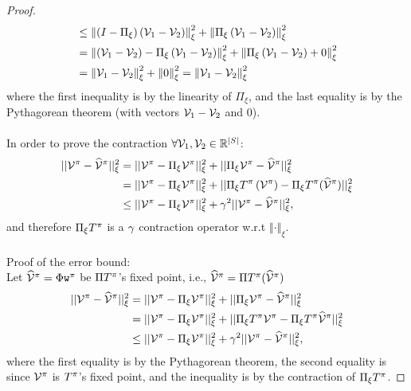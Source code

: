 \begin{proof}
\begin{align*}
 & \le\left\Vert \left(I-\Pi_{\xi}\right)\left(\mathcal{V}_{1}-\mathcal{V}_{2}\right)\right\Vert _{\xi}^{2}+\left\Vert \Pi_{\xi}\left(\mathcal{V}_{1}-\mathcal{V}_{2}\right)\right\Vert _{\xi}^{2}\\
 & =\left\Vert \left(\mathcal{V}_{1}-\mathcal{V}_{2}\right)-\Pi_{\xi}\left(\mathcal{V}_{1}-\mathcal{V}_{2}\right)\right\Vert _{\xi}^{2}+\left\Vert \Pi_{\xi}\left(\mathcal{V}_{1}-\mathcal{V}_{2}\right)+0\right\Vert _{\xi}^{2}\\
 & =\left\Vert \mathcal{V}_{1}-\mathcal{V}_{2}\right\Vert _{\xi}^{2}+\left\Vert 0\right\Vert _{\xi}^{2}=\left\Vert \mathcal{V}_{1}-\mathcal{V}_{2}\right\Vert _{\xi}^{2}
\end{align*}
where the first inequality is by the linearity of $\Pi_\xi$, and the last equality is by the Pythagorean theorem (with vectors ${\mathcal{V}}_1-{\mathcal{V}}_2$ and $0$).
\\
\\
In order to prove the contraction $\forall {\mathcal{V}}_1,{\mathcal{V}}_2\in \mathbb{R}^{|S|}$:
\begin{equation*}
\begin{split}||\mathcal{V}^{\pi}-\widehat{\mathcal{V}}^{\pi}||_{\xi}^{2} & =||\mathcal{V}^{\pi}-\Pi_{\xi}\mathcal{V}^{\pi}||_{\xi}^{2}+||\Pi_{\xi}\mathcal{V}^{\pi}-\widehat{\mathcal{V}}^{\pi}||_{\xi}^{2}\\
 & =||\mathcal{V}^{\pi}-\Pi_{\xi}\mathcal{V}^{\pi}||_{\xi}^{2}+||\Pi_{\xi}T^{\pi}\left(\mathcal{V}^{\pi}\right)-\Pi_{\xi}T^{\pi}(\widehat{\mathcal{V}}^{\pi})||_{\xi}^{2}\\
 & \leq||\mathcal{V}^{\pi}-\Pi_{\xi}\mathcal{V}^{\pi}||_{\xi}^{2}+\gamma^{2}||\mathcal{V}^{\pi}-\widehat{\mathcal{V}}^{\pi}||_{\xi}^{2},
\end{split}
\end{equation*}
and therefore $\Pi_\xi T^\pi$ is a $\gamma$ contraction operator w.r.t $\left\Vert \cdot \right\Vert_{\xi}$.
\\
\\
Proof of the error bound:\\
Let $\widehat{\mathcal{V}}^{\pi} = \Phi \texttt{w}^{\pi}$ be $\Pi T^\pi$'s fixed point, i.e., $\widehat{\mathcal{V}}^{\pi} = \Pi T^\pi(\widehat{\mathcal{V}}^{\pi})$
\begin{equation}
\begin{split}
  ||\mathcal{V}^\pi - \widehat{\mathcal{V}}^{\pi}||_\xi^2  &= ||\mathcal{V}^\pi
-\Pi_\xi \mathcal{V}^\pi||_\xi^2 + ||\Pi_\xi \mathcal{V}^\pi -\widehat{\mathcal{V}}^{\pi}||_\xi^2  \\
    &= ||\mathcal{V}^\pi -\Pi_\xi \mathcal{V}^\pi||_\xi^2 + ||\Pi_\xi T^\pi \mathcal{V}^\pi -\Pi_\xi T^\pi\widehat{\mathcal{V}}^{\pi}||_\xi^2 \\
&\leq ||\mathcal{V}^\pi -\Pi_\xi \mathcal{V}^\pi||_\xi^2 + \gamma^2||\mathcal{V}^\pi-\widehat{\mathcal{V}}^{\pi}||_\xi^2,
\end{split}
\end{equation}
where the first equality is by the Pythagorean theorem, the second equality is since $\mathcal{V}^\pi$ is $T^\pi$'s fixed point, and the inequality is by the contraction of $\Pi_\xi T^\pi$.


\end{proof}
